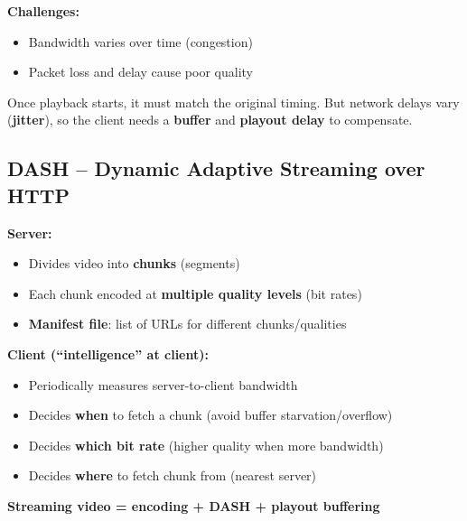 \begin{center}
\end{center}

\textbf{Challenges:}
\begin{itemize}[noitemsep]
    \item Bandwidth varies over time (congestion)
    \item Packet loss and delay cause poor quality
\end{itemize}

\begin{warnbox}
Once playback starts, it must match the original timing. But network delays vary (\textbf{jitter}), so the client needs a \textbf{buffer} and \textbf{playout delay} to compensate.
\end{warnbox}

\subsection{DASH -- Dynamic Adaptive Streaming over HTTP}

\begin{keybox}[DASH]
\textbf{Server:}
\begin{itemize}[noitemsep]
    \item Divides video into \textbf{chunks} (segments)
    \item Each chunk encoded at \textbf{multiple quality levels} (bit rates)
    \item \textbf{Manifest file}: list of URLs for different chunks/qualities
\end{itemize}

\textbf{Client (``intelligence'' at client):}
\begin{itemize}[noitemsep]
    \item Periodically measures server-to-client bandwidth
    \item Decides \textbf{when} to fetch a chunk (avoid buffer starvation/overflow)
    \item Decides \textbf{which bit rate} (higher quality when more bandwidth)
    \item Decides \textbf{where} to fetch chunk from (nearest server)
\end{itemize}

\textbf{Streaming video = encoding + DASH + playout buffering}
\end{keybox}

